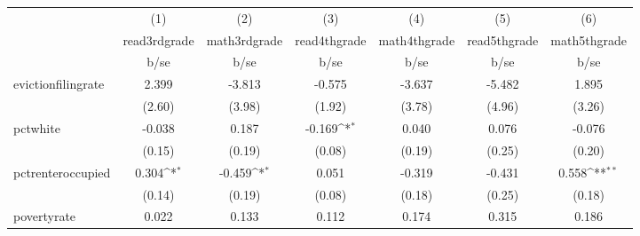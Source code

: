 {
\def\sym#1{\ifmmode^{#1}\else\(^{#1}\)\fi}
\begin{tabular}{l*{6}{c}}
\hline\hline
            &\multicolumn{1}{c}{(1)}           &\multicolumn{1}{c}{(2)}           &\multicolumn{1}{c}{(3)}           &\multicolumn{1}{c}{(4)}           &\multicolumn{1}{c}{(5)}           &\multicolumn{1}{c}{(6)}           \\
            &\multicolumn{1}{c}{read3rdgrade}  &\multicolumn{1}{c}{math3rdgrade}  &\multicolumn{1}{c}{read4thgrade}  &\multicolumn{1}{c}{math4thgrade}  &\multicolumn{1}{c}{read5thgrade}  &\multicolumn{1}{c}{math5thgrade}  \\
            &                     b/se         &                     b/se         &                     b/se         &                     b/se         &                     b/se         &                     b/se         \\
\hline
evictionfilingrate&                    2.399         &                   -3.813         &                   -0.575         &                   -3.637         &                   -5.482         &                    1.895         \\
            &                   (2.60)         &                   (3.98)         &                   (1.92)         &                   (3.78)         &                   (4.96)         &                   (3.26)         \\
pctwhite    &                   -0.038         &                    0.187         &                   -0.169\sym{*}  &                    0.040         &                    0.076         &                   -0.076         \\
            &                   (0.15)         &                   (0.19)         &                   (0.08)         &                   (0.19)         &                   (0.25)         &                   (0.20)         \\
pctrenteroccupied&                    0.304\sym{*}  &                   -0.459\sym{*}  &                    0.051         &                   -0.319         &                   -0.431         &                    0.558\sym{**} \\
            &                   (0.14)         &                   (0.19)         &                   (0.08)         &                   (0.18)         &                   (0.25)         &                   (0.18)         \\
povertyrate &                    0.022         &                    0.133         &                    0.112         &                    0.174         &                    0.315         &                    0.186         \\

\end{tabular}}
